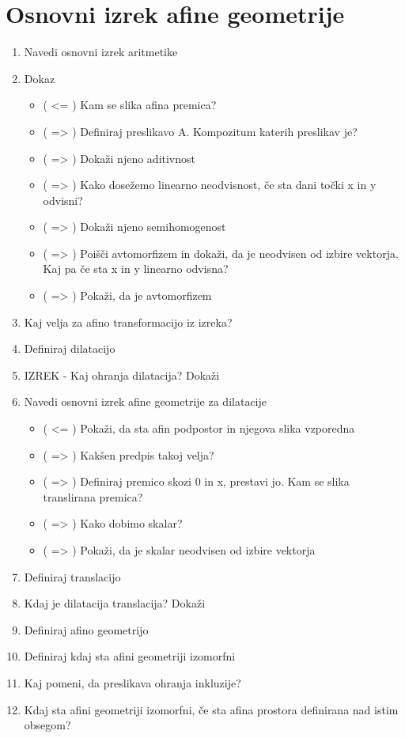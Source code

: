 \documentclass{article}
\begin{document}
    \section{Osnovni izrek afine geometrije}
    \begin{enumerate}
        \item Navedi osnovni izrek aritmetike
        \item Dokaz
        \begin{itemize}
            \item ( <= ) Kam se slika afina premica?
            \item ( => ) Definiraj preslikavo A. Kompozitum katerih preslikav je?
            \item ( => ) Dokaži njeno aditivnost
            \item ( => ) Kako dosežemo linearno neodvisnost, če sta dani točki x in y odvisni?
            \item ( => ) Dokaži njeno semihomogenost
            \item ( => ) Poišči avtomorfizem in dokaži, da je neodvisen od izbire vektorja. Kaj pa če sta x in y linearno odvisna?
            \item ( => ) Pokaži, da je avtomorfizem
        \end{itemize}
        \item Kaj velja za afino transformacijo iz izreka?
        \item Definiraj dilatacijo
        \item IZREK - Kaj ohranja dilatacija? Dokaži
        \item Navedi osnovni izrek afine geometrije za dilatacije
        \begin{itemize}
            \item ( <= ) Pokaži, da sta afin podpostor in njegova slika vzporedna
            \item ( => ) Kakšen predpis takoj velja?
            \item ( => ) Definiraj premico skozi 0 in x, prestavi jo. Kam se slika translirana premica?
            \item ( => ) Kako dobimo skalar?
            \item ( => ) Pokaži, da je skalar neodvisen od izbire vektorja
        \end{itemize}
        \item Definiraj translacijo
        \item Kdaj je dilatacija translacija? Dokaži
        \item Definiraj afino geometrijo
        \item Definiraj kdaj sta afini geometriji izomorfni
        \item Kaj pomeni, da preslikava ohranja inkluzije?
        \item Kdaj sta afini geometriji izomorfni, če sta afina prostora definirana nad istim obsegom?
    \end{enumerate}
\end{document}
